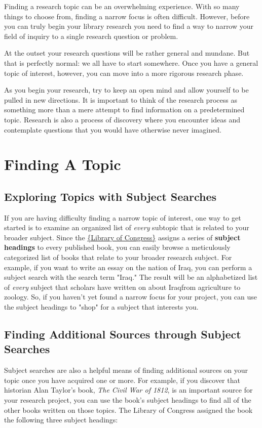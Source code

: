 Finding a research topic can be an overwhelming experience. With so many things 
to choose from, finding a narrow focus is often difficult. However, before you 
can truly begin your library research you need to find a way to narrow your 
field of inquiry to a single research question or problem.

At the outset your research questions will be rather general and mundane. But 
that is perfectly normal: we all have to start somewhere. Once you have a 
general topic of interest, however, you can move into a more rigorous research 
phase.

As you begin your research, try to keep an open mind and allow yourself to be 
pulled in new directions. It is important to think of the research process as 
something more than a mere attempt to find information on a predetermined 
topic. Research is also a process of discovery where you encounter ideas and 
contemplate questions that you would have otherwise never imagined. 

\section{Finding A Topic}
\subsection{Exploring Topics with Subject Searches}
If you are having difficulty finding a narrow topic of interest, one way to get 
started is to examine an organized list of \emph{every} subtopic that is 
related to your broader subject. Since the 
\href{http://catalog.loc.gov}{\{Library of Congress\}} assigns a series of 
\textbf{subject headings} to every published book, you can easily browse a 
meticulously categorized list of books that relate to your broader research 
subject. For example, if you want to write an essay on the nation of Iraq, you 
can perform a subject search with the search term "Iraq." The result will be an 
alphabetized list of \emph{every} subject that scholars have written on about 
Iraq\textemdash from agriculture to zoology. So, if you haven't yet found a 
narrow focus for your project, you can use the subject headings to "shop" for a 
subject that interests you. 

\subsection{Finding Additional Sources through Subject Searches}
Subject searches are also a helpful means of finding additional sources on your 
topic once you have acquired one or more. For example, if you discover that 
historian Alan Taylor's book, \emph{The Civil War of 1812}, is an important 
source for your research project, you can use the book's subject headings to 
find all of the other books written on those topics. The Library of Congress 
assigned the book the following three subject headings:

